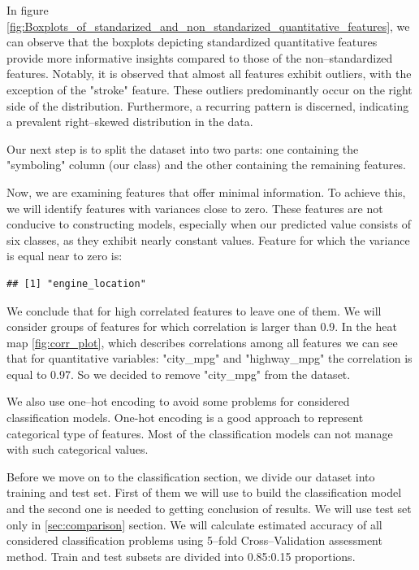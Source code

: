 \documentclass[11pt,a4paper]{article}\usepackage[]{graphicx}\usepackage[]{xcolor}
\makeatletter
\newenvironment{kframe}{%
 \def\at@end@of@kframe{}%
 \ifinner\ifhmode%
  \def\at@end@of@kframe{\end{minipage}}%
  \begin{minipage}{\columnwidth}%
 \fi\fi%
 \def\FrameCommand##1{\hskip\@totalleftmargin \hskip-\fboxsep
 \colorbox{shadecolor}{##1}\hskip-\fboxsep
     \hskip-\linewidth \hskip-\@totalleftmargin \hskip\columnwidth}%
 \MakeFramed {\advance\hsize-\width
   \@totalleftmargin\z@ \linewidth\hsize
   \@setminipage}}%
 {\par\unskip\endMakeFramed%
 \at@end@of@kframe}
\newenvironment{knitrout}{}{} %
\makeatother
\begin{document}
	
In figure \ref{fig:Boxplots_of_standarized_and_non_standarized_quantitative_features}, we can observe that the boxplots depicting standardized quantitative features provide more informative insights compared to those of the non--standardized features. Notably, it is observed that almost all features exhibit outliers, with the exception of the "stroke" feature. These outliers predominantly occur on the right side of the distribution. Furthermore, a recurring pattern is discerned, indicating a prevalent right--skewed distribution in the data.
	
Our next step is to split the dataset into two parts: one containing the "symboling" column (our class) and the other containing the remaining features.

	

	
	Now, we are examining features that offer minimal information. To achieve this, we will identify features with variances close to zero. These features are not conducive to constructing models, especially when our predicted value consists of six classes, as they exhibit nearly constant values. Feature for which the variance is equal near to zero is:
	
\begin{knitrout}
\color{fgcolor}\begin{kframe}
\begin{verbatim}
## [1] "engine_location"
\end{verbatim}
\end{kframe}
\end{knitrout}
	

	
	We conclude that for high correlated features to leave one of them. We will consider groups of features for which correlation is larger than 0.9. In the heat map \ref{fig:corr_plot}, which describes correlations among all features we can see that for quantitative variables: "city\_mpg" and "highway\_mpg" the correlation is equal to 0.97. So we decided to remove "city\_mpg" from the dataset.
	

	
	We also use one--hot encoding to avoid some problems for considered classification models. One-hot encoding is a good approach to represent categorical type of features. Most of the classification models can not manage with such categorical values. 
	
	Before we move on to the classification section, we divide our dataset into training and test set. First of them we will use to build the classification model and the second one is needed to getting conclusion of results. We will use test set only in \ref{sec:comparison} section. We will calculate estimated accuracy of all considered classification problems using 5--fold Cross--Validation assessment method. Train and test subsets are divided into 0.85:0.15 proportions.
	
\end{document}
